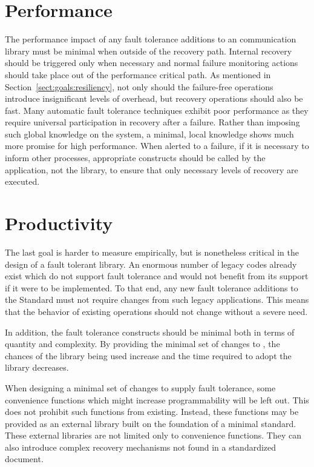 \section{Performance}\label{sect:goals:performance}

The performance impact of any fault tolerance additions to an \mpi communication
library must be minimal when outside of the recovery path. Internal recovery
should be triggered only when necessary and normal failure monitoring actions
should take place out of the performance critical path. As mentioned in
Section~\ref{sect:goals:resiliency}, not only should the failure-free operations
introduce insignificant levels of overhead, but recovery operations should also be fast.
Many automatic fault tolerance techniques exhibit poor performance as they require 
universal participation in recovery after a failure. Rather than imposing such global
knowledge on the system, a minimal, local knowledge shows much more promise for
high performance. When alerted to a failure, if it is necessary to inform other
processes, appropriate constructs should be called by the application, not the
library, to ensure that only necessary levels of recovery are executed.

\section{Productivity}\label{sect:goals:productivity}

The last goal is harder to measure empirically, but is nonetheless critical in
the design of a fault tolerant \mpi library. An enormous number of legacy \mpi
codes already exist which do not support fault tolerance and would not benefit
from its support if it were to be implemented. To that end, any new fault
tolerance additions to the \mpi Standard must not require changes from such
legacy applications. This means that the behavior of existing \mpi operations
should not change without a severe need.

In addition, the fault tolerance constructs should be minimal both in terms of
quantity and complexity. By providing the minimal set of changes to \mpi,
the chances of the library being used increase and the time required to adopt
the library decreases.

When designing a minimal set of changes to supply fault tolerance, some 
convenience functions which might increase programmability will be left out. This 
does not prohibit such functions from existing. Instead, these functions may be 
provided as an external library built on the foundation of a minimal standard. 
These external libraries are not limited only to convenience functions. They can 
also introduce complex recovery mechanisms not found in a standardized document.
